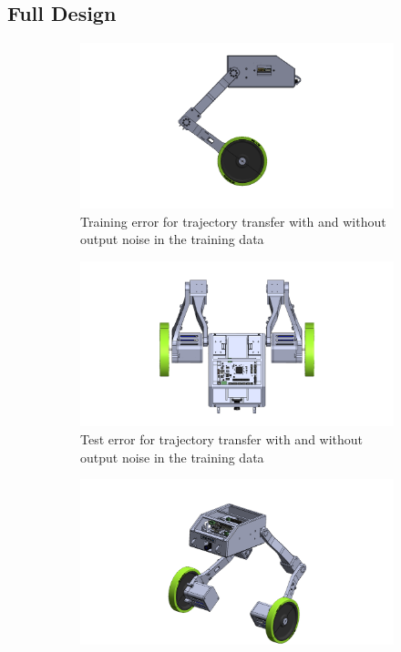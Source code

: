 \subsection{Full Design}
\begin{figure}[h!]
	\centering
	\begin{subfigure}[t]{1\textwidth}
		\centering\captionsetup{width=.87\linewidth}
		\includegraphics[width=\textwidth]{Robot_Assembly_1}
		\caption{Training error for trajectory transfer with and without output noise in the training data}
		\label{subfig:sim1_lsd_results_training}
	\end{subfigure}
	\hfill
	\begin{subfigure}[t]{1\textwidth}
		\centering\captionsetup{width=.87\linewidth}
		\includegraphics[width=\textwidth]{Robot_Assembly_2}
		\caption{Test error for trajectory transfer with and without output noise in the training data}
		\label{subfig:sim1_lsd_results_test}
	\end{subfigure}
	\par\bigskip
	\begin{subfigure}[t]{1\textwidth}
		\centering\captionsetup{width=.87\linewidth}
		\includegraphics[width=\textwidth]{Robot_Assembly_3}

\end{subfigure}
\end{figure}
